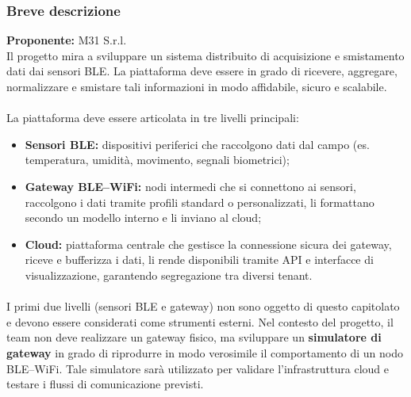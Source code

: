 \documentclass[a4paper,11pt]{article}
\begin{document}
\subsubsection{Breve descrizione}
\textbf{Proponente:} M31 S.r.l.
\vspace{0.5em}\\
Il progetto mira a sviluppare un sistema distribuito di acquisizione e smistamento dati dai sensori BLE. 
La piattaforma deve essere in grado di ricevere, aggregare, normalizzare e smistare tali informazioni in modo affidabile, sicuro e scalabile.

\paragraph{} 
La piattaforma deve essere articolata in tre livelli principali:

\begin{itemize}
 \item \textbf{Sensori BLE:} dispositivi periferici che raccolgono dati dal campo (es. temperatura, umidità, movimento, segnali biometrici);
 \item \textbf{Gateway BLE--WiFi:} nodi intermedi che si connettono ai sensori, raccolgono i dati tramite profili standard o personalizzati, 
 li formattano secondo un modello interno e li inviano al cloud;
 \item \textbf{Cloud:} piattaforma centrale che gestisce la connessione sicura dei gateway, riceve e bufferizza i dati, 
 li rende disponibili tramite API e interfacce di visualizzazione, garantendo segregazione tra diversi tenant.
\end{itemize}

\paragraph{} 
I primi due livelli (sensori BLE e gateway) non sono oggetto di questo capitolato e devono essere considerati come strumenti esterni. 
Nel contesto del progetto, il team non deve realizzare un gateway fisico, ma sviluppare un \textbf{simulatore di gateway} 
in grado di riprodurre in modo verosimile il comportamento di un nodo BLE--WiFi. 
Tale simulatore sarà utilizzato per validare l'infrastruttura cloud e testare i flussi di comunicazione previsti.
\end{document}
